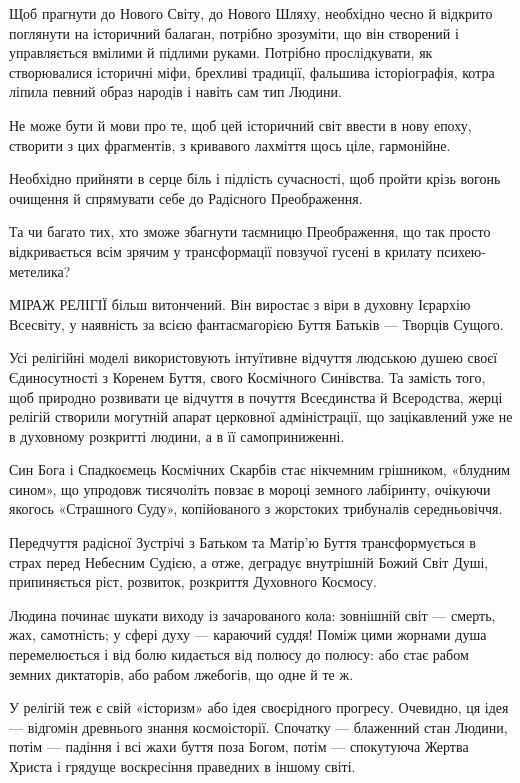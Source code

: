 Щоб прагнути до Нового Світу, до Нового Шляху, необхідно чесно й відкрито
поглянути на історичний балаган, потрібно зрозуміти, що він створений і
управляється вмілими й підлими руками. Потрібно прослідкувати, як створювалися
історичні міфи, брехливі традиції, фальшива історіографія, котра ліпила певний
образ народів і навіть сам тип Людини.

Не може бути й мови про те, щоб цей історичний світ ввести в нову епоху,
створити з цих фрагментів, з кривавого лахміття щось ціле, гармонійне.

Необхідно прийняти в серце біль і підлість сучасності, щоб пройти крізь вогонь
очищення й спрямувати себе до Радісного Преображення.

Та чи багато тих, хто зможе збагнути таємницю Преображення, що так просто
відкривається всім зрячим у трансформації повзучої гусені в крилату
психею-метелика?

МІРАЖ РЕЛІГІЇ більш витончений. Він виростає з віри в духовну Ієрархію
Всесвіту, у наявність за всією фантасмагорією Буття Батьків — Творців Сущого.

Усі релігійні моделі використовують інтуїтивне відчуття людською душею своєї
Єдиносутності з Коренем Буття, свого Космічного Синівства. Та замість того, щоб
природно розвивати це відчуття в почуття Всеєдинства й Всеродства, жерці
релігій створили могутній апарат церковної адміністрації, що зацікавлений уже
не в духовному розкритті людини, а в її самоприниженні.

Син Бога і Спадкоємець Космічних Скарбів стає нікчемним грішником, «блудним
сином», що упродовж тисячоліть повзає в мороці земного лабіринту, очікуючи
якогось «Страшного Суду», копійованого з жорстоких трибуналів середньовіччя.

Передчуття радісної Зустрічі з Батьком та Матір’ю Буття трансформується в страх
перед Небесним Судією, а отже, деградує внутрішній Божий Світ Душі,
припиняється ріст, розвиток, розкриття Духовного Космосу.

Людина починає шукати виходу із зачарованого кола: зовнішній світ — смерть,
жах, самотність; у сфері духу — караючий суддя! Поміж цими жорнами душа
перемелюється і від болю кидається від полюсу до полюсу: або стає рабом земних
диктаторів, або рабом лжебогів, що одне й те ж.

У релігій теж є свій «історизм» або ідея своєрідного прогресу. Очевидно, ця
ідея — відгомін древнього знання космоісторії. Спочатку — блаженний стан
Людини, потім — падіння і всі жахи буття поза Богом, потім — спокутуюча Жертва
Христа і грядуще воскресіння праведних в іншому світі.

